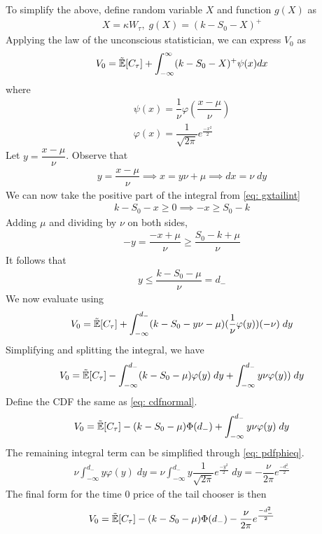 \documentclass[reqno]{amsart}
\begin{document}
To simplify the above, define random variable $X$ and function $g(X)$ as 
\begin{align} 
     X = \kappa W_\tau, \;g(X) = (k - S_0 - X)^+
\end{align}
Applying the law of the unconscious statistician, we can express $V_0$ as 
\begin{align} \label{eq: gxtailint}
     V_0 = \tilde{\mathbb{E}}[C_\tau] + \int_{-\infty}^{\infty} (k - S_0 - X)^+ \psi(x) dx
\end{align}
where
\begin{align} 
     \psi(x) = \dfrac{1}{\nu} \varphi \left( \dfrac{x - \mu}{\nu} \right)\\
     \label{eq: pdfphieq}
     \varphi(x) = \dfrac{1}{\sqrt{2\pi}} e^\frac{-x^2}{2}
\end{align}
Let $y = \dfrac{x - \mu}{\nu}$. Observe that
\begin{align} \label{eq: ysubst}
     y = \dfrac{x - \mu}{\nu} \implies x = y\nu + \mu \implies dx = \nu \;dy
\end{align}
We can now take the positive part of the integral from \eqref{eq: gxtailint}
\begin{align}
     k - S_0 - x \geq 0 \implies -x \geq S_0 - k
\end{align}
Adding $\mu$ and dividing by $\nu$ on both sides,
\begin{align}
     -y = \dfrac{-x + \mu}{\nu} \geq \dfrac{S_0 - k + \mu}{\nu}
\end{align}
It follows that 
\begin{align}
     y \leq \dfrac{k - S_0 - \mu}{\nu} = d_-
\end{align}
We now evaluate  using 
\begin{align} 
     V_0 = \tilde{\mathbb{E}}[C_\tau] + \int_{-\infty}^{d_-} (k - S_0 - y\nu - \mu) (\dfrac{1}{\nu} \varphi(y)) (-\nu) \;dy
\end{align}
Simplifying and splitting the integral, we have
\begin{align} 
     V_0 = \tilde{\mathbb{E}}[C_\tau] - \int_{-\infty}^{d_-} (k - S_0 - \mu) \varphi(y) \;dy + \int_{-\infty}^{d_-} y\nu \varphi(y)) \;dy
\end{align}
Define the CDF the same as \eqref{eq: cdfnormal}. 
\begin{align} 
     V_0 = \tilde{\mathbb{E}}[C_\tau] - (k - S_0 - \mu) \Phi(d_-) + \int_{-\infty}^{d_-} y\nu \varphi(y) \;dy
\end{align}
The remaining integral term can be simplified through \eqref{eq: pdfphieq}.
\begin{align} 
     \nu \int_{-\infty}^{d_-} y \varphi(y) \;dy = \nu \int_{-\infty}^{d_-} y \dfrac{1}{\sqrt{2\pi}} e^{\frac{-y^2}{2}} \;dy = -\dfrac{\nu}{2\pi} e^{\frac{-d_-^2}{2}}
\end{align}
The final form for the time 0 price of the tail chooser is then 
\begin{align} 
     V_0 = \tilde{\mathbb{E}}[C_\tau] - (k - S_0 - \mu) \Phi(d_-) -\dfrac{\nu}{2\pi} e^{\frac{-d_-^2}{2}}
\end{align}
\end{document}
